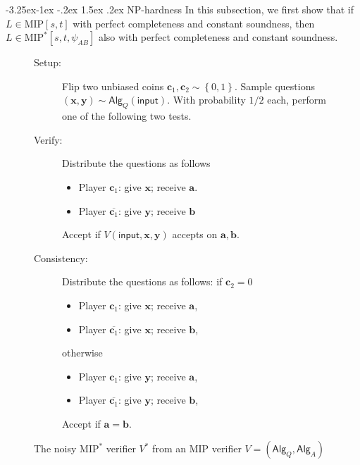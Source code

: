 \documentclass[10pt,a4paper]{article}
\makeatletter
\renewcommand{\subsection}{\@startsection{subsection}{2}{\z@}%
             {-3.25ex\@plus -1ex \@minus -.2ex}%
             {1.5ex \@plus .2ex}%
             {\normalfont\large\scshape\bfseries}}
\theoremstyle{plain}
\theoremstyle{definition}
\newcommand {\set} [1] {\ensuremath{ \left\lbrace #1 \right\rbrace }}
\newenvironment{Algorithm}{\begin{framed}}{\end{framed}}
\newcommand{\1}{\mathbb{1}} %
\newcommand{\ba}{\pmb{a}}
\newcommand{\bb}{\pmb{b}}
\newcommand{\bc}{\pmb{c}}
\newcommand{\bx}{\pmb{x}}
\newcommand{\by}{\pmb{y}}
\newcommand{\ipt}{\mathsf{input}}
\newcommand{\Alg}{\mathsf{Alg}}
\newcommand{\MIP}{\mathrm{MIP}}
\makeatother
\begin{document}
\subsection{NP-hardness}
\label{sec:np-hard}
In this subsection, we first show that if $L \in \MIP[s,t]$ with perfect completeness and constant soundness, then $L \in \MIP^*[s,t,\psi_{AB}]$ also with perfect completeness and constant soundness.

\begin{figure}
 \begin{Algorithm}
    \begin{description}
    	\item[Setup:] Flip two unbiased coins $\bc_1, \bc_2 \sim \set{0,1}$. 
             Sample questions $(\bx,\by) \sim \Alg_Q(\ipt)$.
             With probability $1/2$ each, perform one of the following two tests.
             \item[Verify:] Distribute the questions as follows
             \begin{itemize}
                 \item Player $\bc_1$: give $\bx$; receive $\ba$.
    		\item Player $\overline{\bc_1}$: give $\by$; receive $\bb$
    		\end{itemize}
    		Accept if $V(\ipt, \bx, \by)$ accepts on $\ba, \bb$.
            \item[Consistency:] Distribute the questions as follows:
                if $\bc_2 = 0$
                \begin{itemize}
                 \item Player $\bc_1$: give $\bx$; receive $\ba$,
    		      \item Player $\overline{\bc_1}$: give $\bx$; receive $\bb$,
                \end{itemize}
                otherwise 
                \begin{itemize}
                 \item Player $\bc_1$: give $\by$; receive $\ba$,
    		      \item Player $\overline{\bc_1}$: give $\by$; receive $\bb$,
    		\end{itemize}
    		Accept if $\ba = \bb$.
    \end{description}
    \end{Algorithm}
    \caption{The noisy $\MIP^*$ verifier $V^*$ from an $\MIP$ verifier $V = (\Alg_Q,\Alg_A)$}\label{fig:verifier}
    \end{figure}
\end{document}
